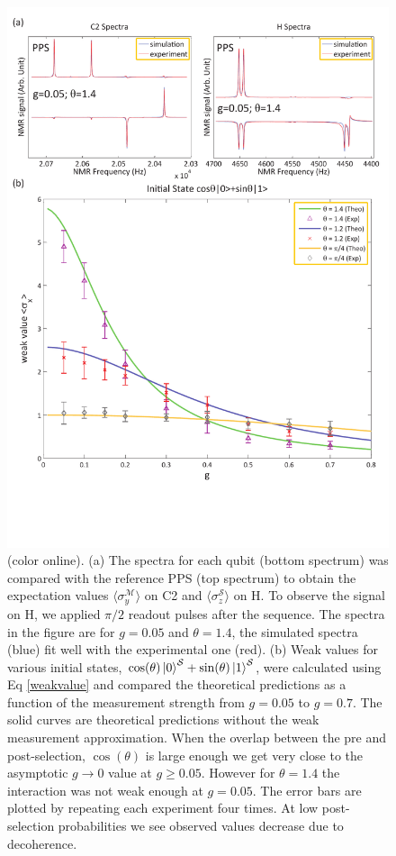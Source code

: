 \documentclass[aps,pra,12pt,onecolumn,showpacs,superscriptaddress,floatfix,footinbib,subfigure]{revtex4}
\def\ket#1{\mathinner{|{#1}\rangle}}
\def\es{{\mathcal{S}}}
\def\md{{\mathcal{M}}}
\begin{document}
\begin{figure}[t] \centering
\includegraphics[width=0.85\columnwidth]{gweak.pdf}
\caption{(color online). (a) The spectra for each qubit (bottom spectrum) was compared with the reference PPS  (top spectrum) to obtain the expectation values $\langle\sigma_y^\md\rangle$ on C2 and $\langle\sigma_z^\es\rangle$ on H.   To observe the signal  on H, we  applied $\pi/2$ readout pulses after the sequence.  The spectra in the figure are for  $g=0.05$ and $\theta = 1.4$, the simulated spectra (blue) fit well with the experimental one (red).   (b) Weak values for various initial states, $\cos(\theta)\ket{0}^\es+\sin(\theta)\ket{1}^\es$,  were calculated using Eq \eqref{weakvalue}  and  compared the theoretical predictions  as a function of the measurement strength  from  $g=0.05$  to $g=0.7$.   The solid curves are theoretical predictions without the weak measurement approximation.  When the overlap between the pre and post-selection, $\cos(\theta)$  is large enough we  get very close to the asymptotic $g\rightarrow 0$  value at $g\ge0.05$.  However for $\theta=1.4$ the interaction was not weak enough at $g=0.05$.  The error bars are plotted by repeating each experiment four times. At low post-selection probabilities  we see observed values decrease  due to decoherence.}\label{gweak}
\end{figure}
\end{document}
